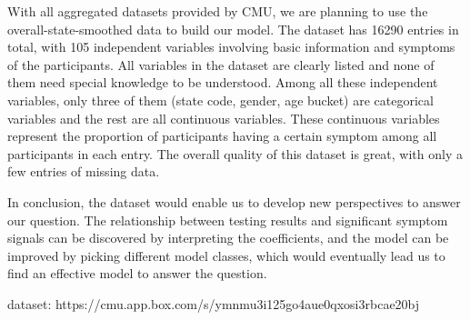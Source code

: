 \documentclass{article}
\begin{document}
With all aggregated datasets provided by CMU, we are planning to use the overall-state-smoothed data to build our model. The dataset has 16290 entries in total, with 105 independent variables involving basic information and symptoms of the participants. All variables in the dataset are clearly listed and none of them need special knowledge to be understood. Among all these independent variables, only three of them (state code, gender, age bucket) are categorical variables and the rest are all continuous variables. These continuous variables represent the proportion of participants having a certain symptom among all participants in each entry. The overall quality of this dataset is great, with only a few entries of missing data.
\vspace{12pt} %

In conclusion, the dataset would enable us to develop new perspectives to answer our question. The relationship between testing results and significant symptom signals can be discovered by interpreting the coefficients, and the model can be improved by picking different model classes, which would eventually lead us to find an effective model to answer the question. 
\vspace{12pt} %

dataset: https://cmu.app.box.com/s/ymnmu3i125go4aue0qxosi3rbcae20bj
\end{document}
